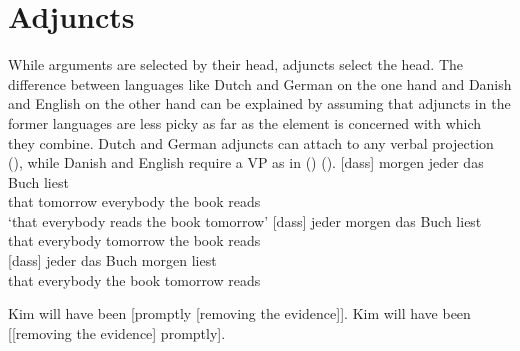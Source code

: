



\section{Adjuncts}

While arguments are selected by their head, adjuncts select the head. The difference between
languages like Dutch and German on the one hand and Danish and English on the other hand can be
explained by assuming that adjuncts in the former languages are less picky as far as the element is
concerned with which they combine. Dutch and German adjuncts can attach to any verbal projection (),
while Danish and English require a VP as in () (\citealp{Wechsler2015a}).
\eal
\ex
\label{ex-m-j-b-l} 
\gll {}[dass] morgen jeder das Buch liest\\
     \spacebr{}that tomorrow everybody the book reads\\
\glt `that everybody reads the book tomorrow'
\ex
\label{ex-j-m-b-l} 
\gll {}[dass] jeder morgen das Buch liest\\
     \spacebr{}that everybody tomorrow the book reads\\ 
\ex
\label{ex-j-b-m-l}
\gll {}[dass] jeder das Buch morgen liest\\
    \spacebr{}that everybody the book tomorrow reads\\
\zl

\eal
\ex Kim will have been [promptly [removing the evidence]].
\ex Kim will have been [[removing the evidence] promptly].
\zl

